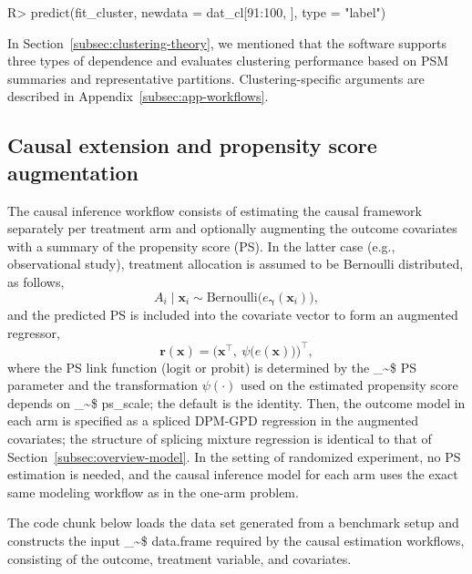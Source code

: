 \documentclass[preprint,12pt,authoryear]{elsarticle}
\makeatletter
\newcommand\code{\bgroup\@makeother\_\@makeother\~\@makeother\$\@codex}
\def\@codex#1{{\normalfont\ttfamily\hyphenchar\font=-1 #1}\egroup}
\renewenvironment{Schunk}{\vspace{0pt}}{\vspace{-0.1\baselineskip}}
\makeatother
\begin{document}
\begin{Schunk}
\begin{Sinput}
R> predict(fit_cluster, newdata = dat_cl[91:100, ], type = "label")
\end{Sinput}
\end{Schunk}

In Section~\ref{subsec:clustering-theory}, we mentioned that the software supports three types of dependence and evaluates clustering performance based on PSM summaries and representative partitions.
Clustering-specific arguments are described in Appendix~\ref{subsec:app-workflows}.



\subsection{Causal extension and propensity score augmentation}
\label{subsec:overview-causal}

The causal inference workflow consists of estimating the causal
framework separately per treatment arm and optionally augmenting the
outcome covariates with a summary of the propensity score (PS). In the
latter case (e.g., observational study), treatment allocation is
assumed to be Bernoulli distributed, as follows,
\begin{equation*}
A_i \mid \boldsymbol{x}_i \sim \mathrm{Bernoulli}\big(e_{\boldsymbol{\gamma}}(\boldsymbol{x}_i)\big),
\end{equation*}
and the predicted PS is included into the covariate vector to form an
augmented regressor,
\begin{equation*}
\boldsymbol{r}(\boldsymbol{x}) = \big(\boldsymbol{x}^\top,\ \psi\big(\widehat e(\boldsymbol{x})\big)\big)^\top,
\end{equation*}
where the PS link function (logit or probit) is determined by the
\code{PS} parameter and the transformation $\psi(\cdot)$ used on the
estimated propensity score depends on \code{ps\_scale}; the default
is the identity. Then, the outcome model in each arm is specified as
a spliced DPM-GPD regression in the augmented covariates; the
structure of splicing mixture regression is identical to that of
Section~\ref{subsec:overview-model}. In the setting of randomized
experiment, no PS estimation is needed, and the causal inference model
for each arm uses the exact same modeling workflow as in the
one-arm problem.

The code chunk below loads the data set generated from a benchmark
setup and constructs the input \code{data.frame} required by the
causal estimation workflows, consisting of the outcome, treatment
variable, and covariates.
\end{document}
